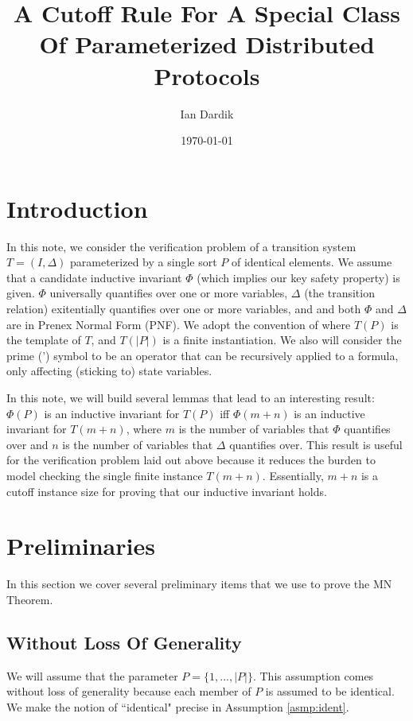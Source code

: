 \documentclass[12pt]{article}
\title{A Cutoff Rule For A Special Class Of Parameterized Distributed Protocols}
\author{Ian Dardik}
\date{\today}
\theoremstyle{definition}
\theoremstyle{remark}
\begin{document}
\maketitle

\section{Introduction}
In this note, we consider the verification problem of a transition system $T=(I,\Delta)$ parameterized by a single sort $P$ of identical elements.  We assume that a candidate inductive invariant $\Phi$ (which implies our key safety property) is given.  $\Phi$ universally quantifies over one or more variables, $\Delta$ (the transition relation) exitentially quantifies over one or more variables, and and both $\Phi$ and $\Delta$ are in Prenex Normal Form (PNF).  We adopt the convention of \cite{goel2021symmetry} where $T(P)$ is the template of $T$, and $T(|P|)$ is a finite instantiation.  We also will consider the prime (') symbol to be an operator that can be recursively applied to a formula, only affecting (sticking to) state variables.

In this note, we will build several lemmas that lead to an interesting result: $\Phi(P)$ is an inductive invariant for $T(P)$ iff $\Phi(m+n)$ is an inductive invariant for $T(m+n)$, where $m$ is the number of variables that $\Phi$ quantifies over and $n$ is the number of variables that $\Delta$ quantifies over.  This result is useful for the verification problem laid out above because it reduces the burden to model checking the single finite instance $T(m+n)$.  Essentially, $m+n$ is a cutoff instance size for proving that our inductive invariant holds.



\section{Preliminaries}
In this section we cover several preliminary items that we use to prove the MN Theorem.

\subsection{Without Loss Of Generality}
We will assume that the parameter $P = \{1,...,|P|\}$.  This assumption comes without loss of generality because each member of $P$ is assumed to be identical.  We make the notion of ``identical" precise in Assumption \ref{asmp:ident}.
\end{document}

